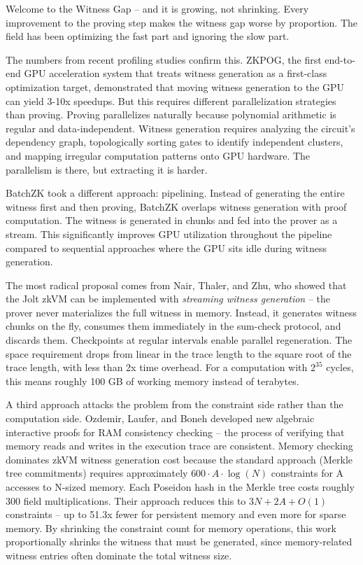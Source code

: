 \documentclass[
  11pt,
  openany]{report}
\begin{document}
Welcome to the Witness Gap -- and it is growing, not shrinking. Every
improvement to the proving step makes the witness gap worse by proportion. The
field has been optimizing the fast part and ignoring the slow part.

The numbers from recent profiling studies confirm this. ZKPOG, the first
end-to-end GPU acceleration system that treats witness generation as a
first-class optimization target, demonstrated that moving witness generation to
the GPU can yield 3-10x speedups. But this requires different parallelization
strategies than proving. Proving parallelizes naturally because polynomial
arithmetic is regular and data-independent. Witness generation requires
analyzing the circuit's dependency graph, topologically sorting gates to
identify independent clusters, and mapping irregular computation patterns onto
GPU hardware. The parallelism is there, but extracting it is harder.

BatchZK took a different approach: pipelining. Instead of generating the entire
witness first and then proving, BatchZK overlaps witness generation with proof
computation. The witness is generated in chunks and fed into the prover as a
stream. This significantly improves GPU utilization throughout the pipeline
compared to sequential approaches where the GPU sits idle during witness
generation.

The most radical proposal comes from Nair, Thaler, and Zhu, who showed that the
Jolt zkVM can be implemented with \emph{streaming witness generation} -- the
prover never materializes the full witness in memory. Instead, it generates
witness chunks on the fly, consumes them immediately in the sum-check protocol,
and discards them. Checkpoints at regular intervals enable parallel
regeneration. The space requirement drops from linear in the trace length to the
square root of the trace length, with less than 2x time overhead. For a
computation with \(2^{35}\) cycles, this means roughly 100 GB of working memory
instead of terabytes.

A third approach attacks the problem from the constraint side rather than the
computation side. Ozdemir, Laufer, and Boneh developed new algebraic interactive
proofs for RAM consistency checking -- the process of verifying that memory
reads and writes in the execution trace are consistent. Memory checking
dominates zkVM witness generation cost because the standard approach (Merkle
tree commitments) requires approximately \(600 \cdot A \cdot \log(N)\)
constraints for A accesses to N-sized memory. Each Poseidon hash in the Merkle
tree costs roughly 300 field multiplications. Their approach reduces this to
\(3N + 2A + O(1)\) constraints -- up to 51.3x fewer for persistent memory and
even more for sparse memory. By shrinking the constraint count for memory
operations, this work proportionally shrinks the witness that must be generated,
since memory-related witness entries often dominate the total witness size.
\end{document}
